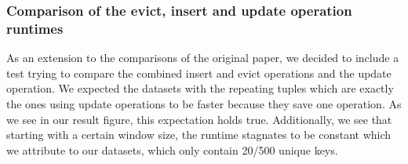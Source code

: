 \subsubsection{Comparison of the evict, insert and update operation runtimes}



As an extension to the comparisons of the original paper, we decided to include a test trying to compare the combined insert and evict operations and the update operation. We expected the datasets with the repeating tuples which are exactly the ones using update operations to be faster because they save one operation. As we see in our result figure, this expectation holds true. Additionally, we see that starting with a certain window size, the runtime stagnates to be constant which we attribute to our datasets, which only contain 20/500 unique keys.

